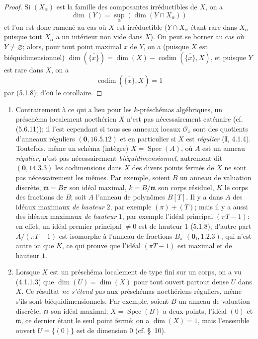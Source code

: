 \begin{proof}
Si $(X_\alpha)$ est la famille des composantes irréductibles de $X$, on a
\[
\dim(Y)=\sup_\alpha(\dim(Y\cap X_\alpha))
\]
et l'on est donc ramené au cas où $X$ est irréductible ($Y\cap X_\alpha$
étant rare dans $X_\alpha$ puisque tout $X_\alpha$ a un intérieur non vide
dans $X$). On peut se borner au cas où $Y\ne\varnothing$; alors, pour tout
point maximal $x$ de $Y$, on a (puisque $X$ est biéquidimensionnel)
$\dim(\overline{\{x\}})=\dim(X)-\operatorname{codim}(\overline{\{x\}},X)$,
et puisque $Y$ est rare dans $X$, on a
\[
\operatorname{codim}(\overline{\{x\}},X)=1
\]
par (5.1.8); d'où le corollaire.
\end{proof}

\begin{remarks}[5.2.5]
\label{IV.2.5.2.5-fr}
\begin{enumerate}
\item[(i)] Contrairement à ce qui a lieu pour les $k$-préschémas algébriques,
un préschéma localement noethérien $X$ n'est pas nécessairement caténaire
(cf. (5.6.11)); il l'est cependant si tous ses anneaux locaux $\mathcal O_x$
sont des quotients d'anneaux réguliers $(\mathbf{0},16.5.12)$ et en particulier si $X$
est \emph{régulier} (\textbf{I}, 4.1.4). Toutefois, même un schéma (intègre)
$X=\operatorname{Spec}(A)$, où $A$ est un anneau \emph{régulier}, n'est pas
nécessairement \emph{biéquidimensionnel}, autrement dit $(\mathbf{0},14.3.3)$ les
codimensions dans $X$ des divers points fermés de $X$ ne sont pas
nécessairement les mêmes. Par exemple, soient $B$ un anneau de valuation
discrète, $\mathfrak m=B\pi$ son idéal maximal, $k=B/\mathfrak m$ son corps
résiduel, $K$ le corps des fractions de $B$; soit $A$ l'anneau de polynômes
$B[T]$. Il y a dans $A$ des idéaux maximaux \emph{de hauteur} $2$, par exemple
$(\pi)+(T)$; mais il y a aussi des idéaux maximaux \emph{de hauteur} $1$, par
exemple l'idéal principal $(\pi T-1)$: en effet, un idéal premier principal
$\ne0$ est de hauteur $1$ (5.1.8); d'autre part
$A/(\pi T-1)$ est isomorphe à l'anneau de fractions $B_\pi$
$(\mathbf{0}_{\mathrm I},1.2.3)$, qui n'est autre ici que $K$, ce qui prouve que
l'idéal $(\pi T-1)$ est maximal et de hauteur $1$.

\item[(ii)] Lorsque $X$ est un préschéma localement de type fini sur un corps,
on a vu (4.1.1.3) que $\dim(U)=\dim(X)$ pour tout ouvert partout dense $U$
dans $X$. Ce résultat \emph{ne s'étend pas} aux préschémas noethériens
réguliers, même s'ils sont biéquidimensionnels. Par exemple, soient $B$ un
anneau de valuation discrète, $\mathfrak m$ son idéal maximal;
$X=\operatorname{Spec}(B)$ a deux points, l'idéal $(0)$ et $\mathfrak m$, ce
dernier étant le seul point fermé; on a $\dim(X)=1$, mais l'ensemble ouvert
$U=\{(0)\}$ est de dimension $0$ (cf. \S~10).
\end{enumerate}
\end{remarks}

